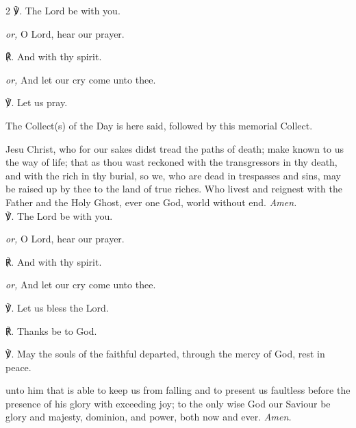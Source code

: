 \begin{multicols}{2}
℣. The Lord be with you.\par
\textit{or,} O Lord, hear our prayer.

℟. And with thy spirit.\par
\textit{or,} And let our cry come unto thee.

℣. Let us pray.

\begin{rubric}
	The Collect(s) of the Day is here said, followed by this memorial Collect.
\end{rubric}

 Jesu Christ, who for our sakes didst tread the paths of death; make known to us the way of life; that as thou wast reckoned with the transgressors in thy death, and with the rich in thy burial, so we, who are dead in trespasses and sins, may be raised up by thee to the land of true riches. Who livest and reignest with the Father and the Holy Ghost, ever one God, world without end. \textit{Amen.}\\

℣. The Lord be with you.\par
\textit{or,} O Lord, hear our prayer.

℟. And with thy spirit.\par
\textit{or,} And let our cry come unto thee.

℣. Let us bless the Lord.

℟. Thanks be to God.

℣. May the souls {} of the faithful departed, through the mercy of God, rest in peace.

 unto him that is able to keep us from falling and to present us faultless before the presence of his glory with exceeding joy; to the only wise God our Saviour be glory and majesty, dominion, and power, both now and ever. \textit{Amen.}

\end{multicols}


